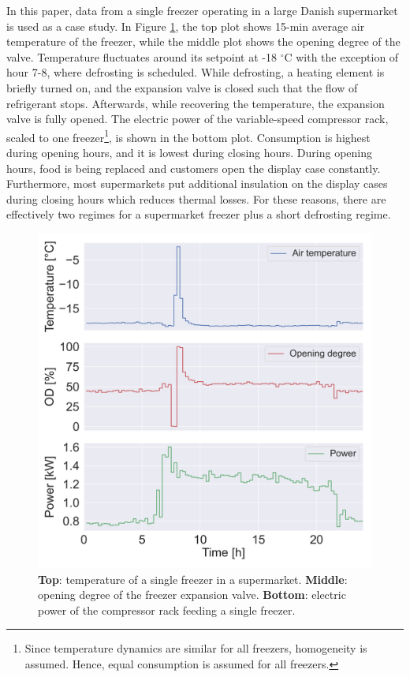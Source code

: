 In this paper, data from a single freezer operating in a large Danish supermarket is used as a case study.
In Figure \ref{fig:chunk}, the top plot shows 15-min average air temperature of the freezer, while the middle plot shows the opening degree of the valve.
Temperature fluctuates around its setpoint at -18 $^{\circ}$C with the exception of hour 7-8, where defrosting is scheduled.
While defrosting, a heating element is briefly turned on, and the expansion valve is closed such that the flow of refrigerant stops. Afterwards, while recovering the temperature, the expansion valve is fully opened.
The electric power of the variable-speed compressor rack, scaled to one freezer\footnote{Since temperature dynamics are similar for all freezers, homogeneity is assumed. Hence, equal consumption is assumed for all freezers.}, is shown in the bottom plot.
Consumption is highest during opening hours, and it is lowest during closing hours.
During opening hours, food is being replaced and customers open the display case constantly.
Furthermore, most supermarkets put additional insulation on the display cases during closing hours which reduces thermal losses.
For these reasons, there are effectively two regimes for a supermarket freezer plus a short defrosting regime.
\begin{figure}[!t]
    \centering
    \includegraphics[width=\columnwidth]{../figures/tmp_od_Pt.png}
    \caption{\textbf{Top}: temperature of a single freezer in a supermarket. \textbf{Middle}: opening degree of the freezer expansion valve. \textbf{Bottom}: electric power of the compressor rack feeding a single freezer.}
    \label{fig:chunk}
\end{figure}


